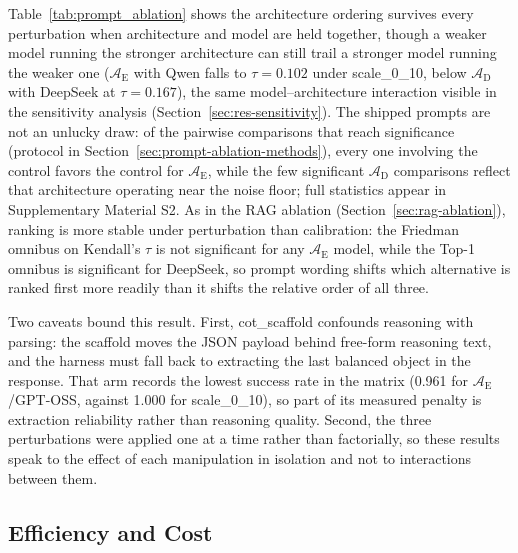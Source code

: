 \documentclass[a4paper,fleqn]{cas-dc}
\begin{document}
Table~\ref{tab:prompt_ablation} shows the architecture ordering survives every perturbation when architecture and model are held together, though a weaker model running the stronger architecture can still trail a stronger model running the weaker one ($\mathcal{A}_{\text{E}}$ with Qwen falls to $\tau = 0.102$ under scale\_0\_10, below $\mathcal{A}_{\text{D}}$ with DeepSeek at $\tau = 0.167$), the same model--architecture interaction visible in the sensitivity analysis (Section~\ref{sec:res-sensitivity}). The shipped prompts are not an unlucky draw: of the pairwise comparisons that reach significance (protocol in Section~\ref{sec:prompt-ablation-methods}), every one involving the control favors the control for $\mathcal{A}_{\text{E}}$, while the few significant $\mathcal{A}_{\text{D}}$ comparisons reflect that architecture operating near the noise floor; full statistics appear in Supplementary Material S2. As in the RAG ablation (Section~\ref{sec:rag-ablation}), ranking is more stable under perturbation than calibration: the Friedman omnibus on Kendall's $\tau$ is not significant for any $\mathcal{A}_{\text{E}}$ model, while the Top-1 omnibus is significant for DeepSeek, so prompt wording shifts which alternative is ranked first more readily than it shifts the relative order of all three.

Two caveats bound this result. First, cot\_scaffold confounds reasoning with parsing: the scaffold moves the JSON payload behind free-form reasoning text, and the harness must fall back to extracting the last balanced object in the response. That arm records the lowest success rate in the matrix (0.961 for $\mathcal{A}_{\text{E}}$/GPT-OSS, against 1.000 for scale\_0\_10), so part of its measured penalty is extraction reliability rather than reasoning quality. Second, the three perturbations were applied one at a time rather than factorially, so these results speak to the effect of each manipulation in isolation and not to interactions between them.

\FloatBarrier
\subsection{Efficiency and Cost}
\label{sec:res-efficiency}
\end{document}
